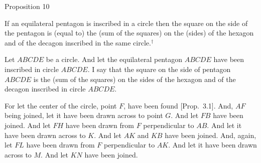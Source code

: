 
\begin{center}
{\large Proposition 10}
\end{center}

If an equilateral pentagon is inscribed in a circle then the square on the
side of the pentagon is (equal to) the (sum of the squares) on the (sides) of
the hexagon and of the decagon inscribed in the same circle.$^\dag$

\epsfysize=2.5in
\centerline{}

Let $ABCDE$ be a circle. And let the equilateral pentagon $ABCDE$
have been inscribed in circle $ABCDE$. I say that the square on the
side of pentagon $ABCDE$ is the (sum of the squares) on the sides
of the hexagon and of the decagon inscribed in circle $ABCDE$. 

For let the center of the circle, point $F$, have been found [Prop.~3.1]. And,
$AF$ being joined, let it have been drawn across to point $G$. And
let $FB$ have been joined. And let $FH$ have been drawn from $F$
perpendicular to $AB$. And let it have been drawn across to $K$. 
And let $AK$ and $KB$ have been joined.  And, again, let $FL$ have
been drawn from $F$ perpendicular to $AK$. And let it have been drawn
across to $M$. And let $KN$ have been joined.

